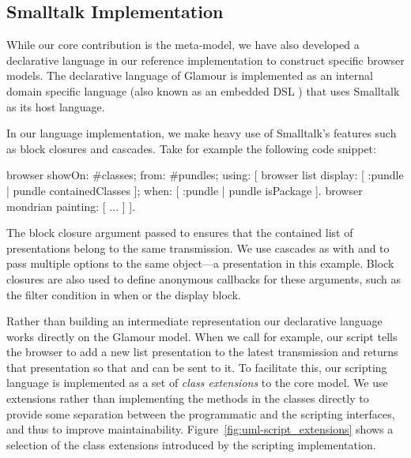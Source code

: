 \documentclass[a4paper,10pt,twoside]{book}
\begin{document}
\subsection{Smalltalk Implementation}
\label{sec:impl/smalltalk-implementation}

While our core contribution is the meta-model, we have also developed a declarative language in our reference implementation to construct specific browser models. The declarative language of Glamour is implemented as an internal domain specific language \cite{Fowl07c} (also known as an embedded DSL \cite{Huda98a}) that uses Smalltalk as its host language.

In our language implementation, we make heavy use of Smalltalk's features such as block closures and cascades. Take for example the following code snippet:

\begin{code}{}
browser showOn: #classes; from: #pundles; using: [
	browser list
		display: [ :pundle | pundle containedClasses ];
		when: [ :pundle | pundle isPackage ].
	browser mondrian painting: [ ... ]
].
\end{code}

The block closure argument passed to  ensures that the contained list of presentations belong to the same transmission. We use cascades as with  and  to pass multiple options to the same object---a presentation in this example. Block closures are also used to define anonymous callbacks for these arguments, such as the filter condition in when or the display block. 

Rather than building an intermediate representation our declarative language works directly on the Glamour model. When we call  for example, our script tells the browser to add a new list presentation to the latest transmission and returns that presentation so that  and  can be sent to it. To facilitate this, our scripting language is implemented as a set of \emph{class extensions} to the core model. We use extensions rather than implementing the methods in the classes directly to provide some separation between the programmatic and the scripting interfaces, and thus to improve maintainability. Figure~\ref{fig:uml-script_extensions} shows a selection of the class extensions introduced by the scripting implementation.
\end{document}
